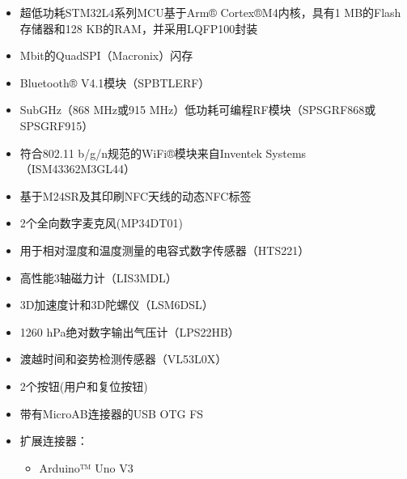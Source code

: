 \documentclass[a4paper,12pt,english]{sphinxmanual}
\begin{document}
\sphinxAtStartPar
{}
\begin{itemize}
\item {} 
\sphinxAtStartPar
超低功耗STM32L4系列MCU基于Arm® Cortex®\sphinxhyphen{}M4内核，具有1 MB的Flash存储器和128 KB的RAM，并采用LQFP100封装

\item {} 
 Mbit的Quad\sphinxhyphen{}SPI（Macronix）闪存

\item {} 
\sphinxAtStartPar
Bluetooth® V4.1模块（SPBTLE\sphinxhyphen{}RF）

\item {} 
\sphinxAtStartPar
Sub\sphinxhyphen{}GHz（868 MHz或915 MHz）低功耗可编程RF模块（SPSGRF\sphinxhyphen{}868或SPSGRF\sphinxhyphen{}915）

\item {} 
\sphinxAtStartPar
符合802.11 b/g/n规范的Wi\sphinxhyphen{}Fi®模块来自Inventek Systems（ISM43362\sphinxhyphen{}M3G\sphinxhyphen{}L44）

\item {} 
\sphinxAtStartPar
基于M24SR及其印刷NFC天线的动态NFC标签

\item {} 
\sphinxAtStartPar
2个全向数字麦克风(MP34DT01)

\item {} 
\sphinxAtStartPar
用于相对湿度和温度测量的电容式数字传感器（HTS221）

\item {} 
\sphinxAtStartPar
高性能3轴磁力计（LIS3MDL）

\item {} 
\sphinxAtStartPar
3D加速度计和3D陀螺仪（LSM6DSL）

\item {} 
\sphinxhyphen{}1260 hPa绝对数字输出气压计（LPS22HB）

\item {} 
\sphinxAtStartPar
渡越时间和姿势检测传感器（VL53L0X）

\item {} 
\sphinxAtStartPar
2个按钮(用户和复位按钮)

\item {} 
\sphinxAtStartPar
带有Micro\sphinxhyphen{}AB连接器的USB OTG FS

\item {} 
\sphinxAtStartPar
扩展连接器：
\begin{itemize}
\item {} 
\sphinxAtStartPar
Arduino™ Uno V3


\end{itemize}
\end{itemize}
\end{document}
